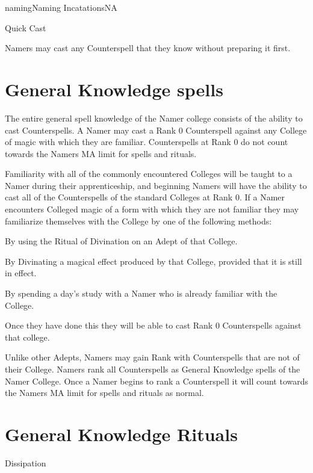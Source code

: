 \begin{College}[2.0]{naming}{Naming Incatations}{NA}
\begin{talent}[T-3]{Quick Cast}

\begin{effects}
Namers may cast any Counterspell that they know without preparing it
first.
\end{effects}
\end{talent}

\section{General Knowledge spells}

The entire general spell knowledge of the Namer college consists of
the ability to cast Counterspells.  A Namer may cast a Rank 0
Counterspell against any College of magic with which they are
familiar.  Counterspells at Rank 0 do not count towards the Namers MA
limit for spells and rituals.

Familiarity with all of the commonly encountered Colleges will be
taught to a Namer during their apprenticeship, and beginning Namers
will have the ability to cast all of the Counterspells of the standard
Colleges at Rank 0. If a Namer encounters Colleged magic of a form
with which they are not familiar they may familiarize themselves with
the College by one of the following methods:
\begin{Itemize}
\item By using the Ritual of Divination on an Adept of that College.
\item By Divinating a magical effect produced by that College,
  provided that it is still in effect.
\item By spending a day’s study with a Namer who is already familiar
  with the College.
\end{Itemize}
Once they have done this they will be able to cast Rank 0
Counterspells against that college.

Unlike other Adepts, Namers may gain Rank with Counterspells that are
not of their College. Namers rank all Counterspells as General
Knowledge spells of the Namer College.  Once a Namer begins to rank a
Counterspell it will count towards the Namers MA limit for spells and
rituals as normal.


\section{General Knowledge Rituals}


\begin{ritual}[Q-1]{Dissipation}



\end{ritual}
\end{College}
